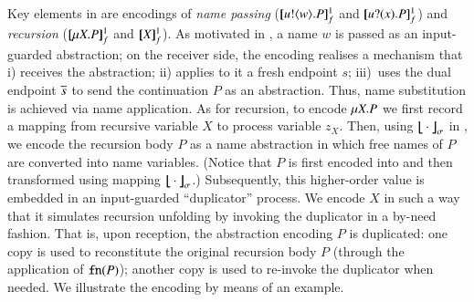 \documentclass[runningheads]{llncs}
\begin{document}
{{Key elements in 
 are encodings of 
{\em name passing} ($[\!\![u ! \langle w \rangle . P]\!\!]^1_f$ and $[\!\![u ? (x) . P]\!\!]^1_f$)  and  
{\em recursion} ($[\!\![\mu X. P]\!\!]^1_f$ and $[\!\![X]\!\!]^1_f$).
As motivated in , %
a name $w$ is passed as an input-guarded abstraction;
on the receiver side,
the encoding realises a mechanism that i) receives
the abstraction; ii) applies to it a fresh  endpoint $s$;
iii)~uses the dual endpoint $\overline{s}$ to send the continuation $P$ as an abstraction.
Thus, name substitution is achieved via name application.
As for recursion, to encode $\mu X. P$ we
first record a mapping from recursive variable $X$ to process variable $z_X$.
Then, using 
$\big\lfloor\!\!\big\lfloor\cdot\big\rfloor\!\!\big\rfloor^{}_\sigma$ in 
, we encode the recursion body $P$ as a name abstraction
in which free names of $P$ are converted into name variables.
(Notice that $P$ is first encoded into \HO and then transformed using mapping
$\big\lfloor\!\!\big\lfloor\cdot\big\rfloor\!\!\big\rfloor^{}_\sigma$.)
Subsequently, this higher-order value is embedded in an input-guarded 
``duplicator'' process. We encode $X$ 
in such a way that it
simulates recursion unfolding by 
invoking the duplicator in a by-need fashion.
That is, upon reception, the \HO abstraction encoding  
$P$
is duplicated: 
one copy is used to reconstitute the original recursion body $P$ (through
the application of $\mathtt{fn}(P)$); another copy is used to re-invoke
the duplicator when needed. %
We illustrate the encoding by means of an example.}


 


}
\end{document}
